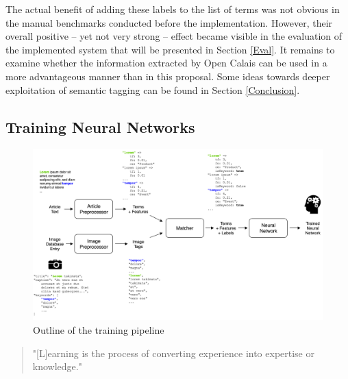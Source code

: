 \documentclass[11pt,a4paper,twoside]{article}
\begin{document}
The actual benefit of adding these labels to the list of terms was not obvious in the manual benchmarks conducted before the implementation. However, their overall positive -- yet not very strong -- effect became visible in the evaluation of the implemented system that will be presented in Section \ref{Eval}. It remains to examine whether the information extracted by Open Calais can be used in a more advantageous manner than in this proposal. Some ideas towards deeper exploitation of semantic tagging can be found in Section \ref{Conclusion}.

\subsection{Training Neural Networks} \label{SystemTrain}

\begin{figure}[t]
  \includegraphics[width=\columnwidth]{picpic-training.png}
  \caption{Outline of the training pipeline}
  \label{fig:picpic-training}
\end{figure}

\begin{quote}
    "[L]earning is the process of converting experience into expertise or knowledge."
    
    \cite[p. 1]{Shalev-Shwartz2014UnderstandingAlgorithms}
\end{quote}
\end{document}
